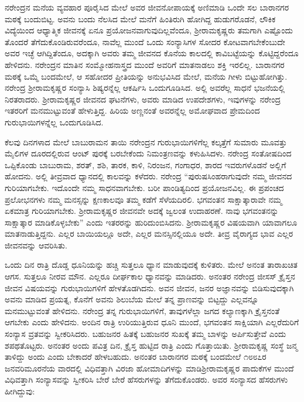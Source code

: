 ನರೇಂದ್ರನ ಮನೆಯ ವ್ಯವಹಾರ ಪೂರೈಸಿದ ಮೇಲೆ ಅವರ ಜೀವನೋಪಾಯಕ್ಕೆ ಅಣಿಮಾಡಿ ಒಂದೇ ಸಲ ಬಾರಾನಗರ ಮಠಕ್ಕೆ ಬಂದುಬಿಟ್ಟ. ಅವನು ಬಂದು ನೆಲಸಿದ ಮೇಲೆ ಮನೆಗೆ ಹಿಂತಿರುಗಿ ಹೋಗಿದ್ದ ಹುಡುಗರೊಡನೆ, ಲೌಕಿಕ ವಿದ್ಯೆಯಿಂದ ಆಧ್ಯಾತ್ಮಿಕ ಜೀವನಕ್ಕೆ ಏನೂ ಪ್ರಯೋಜನವಾಗುವುದಿಲ್ಲವೆಂದೂ, ಶ‍್ರೀರಾಮಕೃಷ್ಣರು ತಮಗಾಗಿ ಎಷ್ಟೊಂದು ತೊಂದರೆ ತೆಗೆದುಕೊಂಡಿರುವರೆಂದೂ, ನಾವೆಲ್ಲ ಮುಂದೆ ಒಂದು ಸಂನ್ಯಾಸಿಗಳ ಸೋದರ ಕೋಟವಾಗಬೇಕೆಂಬುದೇ ಅವರ ಇಚ್ಛೆ ಆಗಿದ್ದಿತೆಂದೂ, ಅದಕ್ಕಾಗಿ ಅವರು ತಮ್ಮ ಜೀವನದ ಕೊನೆಯ ಕಾಲದಲ್ಲಿ ಕಾವಿಬಟ್ಟೆಯನ್ನು ಕೊಟ್ಟಿದ್ದರೆಂದೂ ಹೇಳಿದನು. ನರೇಂದ್ರನ ಮಾತಿನ ಸಂಮ್ಮೋಹನಾಸ್ತ್ರದ ಮುಂದೆ ಅವರಿಗೆ ಮಾತನಾಡಲು ಶಕ್ತಿ ಇರಲಿಲ್ಲ. ಬಾರಾನಗರ ಮಠಕ್ಕೆ ಒಮ್ಮೆ ಬಂದಮೇಲೆ, ಆ ಸಹೋದರ ಪ್ರೀತಿಯನ್ನು ಅನುಭವಿಸಿದ ಮೇಲೆ, ಮನೆಯ ಗೀಳು ಬಿಟ್ಟುಹೋಗಿತ್ತು. ನರೇಂದ್ರ ಶ‍್ರೀರಾಮಕೃಷ್ಣರ ಸಂನ್ಯಾಸಿ ಶಿಷ್ಯರನ್ನೆಲ್ಲ ಆಕರ್ಷಿಸಿ ಒಂದುಗೂಡಿಸಿದ. ಅಲ್ಲಿ ಅವರೆಲ್ಲ ಸಾಧನೆ ಭಜನೆಯಲ್ಲಿ ನಿರತರಾದರು. ಶ‍್ರೀರಾಮಕೃಷ್ಣರ ಜೀವನದ ಘಟನೆಗಳು, ಅವರು ಮಾಡಿದ ಉಪದೇಶಗಳು, ಇವುಗಳನ್ನು ನರೇಂದ್ರ ಇತರರಿಗೆ ಮನಮುಟ್ಟುವಂತೆ ಹೇಳುತ್ತಿದ್ದ. ಹಿರಿಯ ಅಣ್ಣನಂತೆ ಅವರನ್ನೆಲ್ಲ ಅಮೋಘವಾದ ಪ್ರೇಮದಿಂದ ಗುರುಭಾಯಿಗಳನ್ನೆಲ್ಲ ಒಂದುಗೂಡಿಸಿದ.

ಕೆಲವು ದಿನಗಳಾದ ಮೇಲೆ ಬಾಬುರಾಮನ ತಾಯಿ ನರೇಂದ್ರನ ಗುರುಭಾಯಿಗಳಿಗೆಲ್ಲ ಕಲ್ಕತ್ತೆಗೆ ಸುಮಾರು ಮೂವತ್ತು ಮೈಲಿಗಳ ದೂರದಲ್ಲಿರುವ ಆಂಟ್ ಪುರಕ್ಕೆ ಬರಬೇಕೆಂದು ನಿಮಂತ್ರಣವನ್ನು ಕಳುಹಿಸಿದಳು. ನರೇಂದ್ರ ಸಂತೋಷದಿಂದ ಒಪ್ಪಿಕೊಂಡು ಬಾಬುರಾಮ, ಶರತ್, ಶಶಿ, ತಾರಕ, ಕಾಳಿ, ನಿರಂಜನ, ಗಂಗಾಧರ, ಶಾರದ ಇವರುಗಳೊಡನೆ ಅಲ್ಲಿಗೆ ಹೋದನು. ಅಲ್ಲಿ ತೀವ್ರವಾದ ಧ್ಯಾನದಲ್ಲಿ ಕಾಲವನ್ನು ಕಳೆದರು. ನರೇಂದ್ರ “ಪುರುಷಸಿಂಹರಾಗುವುದೇ ನಮ್ಮ ಜೀವನದ ಗುರಿಯಾಗಬೇಕು. ಇದೊಂದೇ ನಮ್ಮ ಸಾಧನವಾಗಬೇಕು. ಬರೀ ಪಾಂಡಿತ್ಯದಿಂದ ಪ್ರಯೋಜನವಿಲ್ಲ. ಈ ಪ್ರಪಂಚದ ಪ್ರಲೋಭನಗಳು ನಮ್ಮ ಮನಸ್ಸನ್ನು ಕ್ಷಣಕಾಲವೂ ತಮ್ಮ ಕಡೆಗೆ ಸೆಳೆಯದಿರಲಿ. ಭಗವಂತನ ಸಾಕ್ಷಾತ್ಕಾರಾವೇ ನಮ್ಮ ಏಕಮಾತ್ರ ಗುರಿಯಾಗಬೇಕು. ಶ‍್ರೀರಾಮಕೃಷ್ಣರ ಜೀವನವೇ ಅದಕ್ಕೆ ಜ್ವಲಂತ ಉದಾಹರಣೆ. ನಾವು ಭಗವಂತನನ್ನು ಸಾಕ್ಷಾತ್ಕಾರ ಮಾಡಿಕೊಳ್ಳಬೇಕು” ಎಂದು ಇತರರನ್ನು ಹುರಿದುಂಬಿಸಿದನು. ಶ‍್ರೀರಾಮಕೃಷ್ಣರ ವಿಷಯವಾಗಿ ಯಾವಾಗಲೂ ಮಾತನಾಡುತ್ತಿದ್ದನು. ಎಲ್ಲರ ಬಾಯಿಯಲ್ಲೂ ಅದೇ, ಎಲ್ಲರ ಮನಸ್ಸಿನಲ್ಲಿಯೂ ಅದೇ. ತೀವ್ರ ವೈರಾಗ್ಯದ ಭಾವ ಎಲ್ಲರ ಜೀವನವನ್ನು ಆವರಿಸಿತು.

ಒಂದು ದಿನ ರಾತ್ರಿ ದೊಡ್ಡ ಧೂನಿಯನ್ನು ಹಚ್ಚಿ ಸುತ್ತಲೂ ಧ್ಯಾನ ಮಾಡುವುದಕ್ಕೆ ಕುಳಿತರು. ಮೇಲೆ ಅನಂತ ತಾರಾಖಚಿತ ಆಗಸ. ಸುತ್ತಲೂ ನೀರವ ಮೌನ. ಎಲ್ಲರೂ ದೀರ್ಘಕಾಲ ಧ್ಯಾನವನ್ನು ಮಾಡಿದರು. ಅನಂತರ ನರೇಂದ್ರ ಜೀಸಸ್ ಕ್ರೈಸ್ತನ ಜೀವನ ವಿಷಯವನ್ನು ಗುರುಭಾಯಿಗಳಿಗೆ ಹೇಳತೊಡಗಿದನು. ಅವನ ಜೀವನ, ಜನರ ಅಜ್ಞಾನವನ್ನು ಬಿಡಿಸುವುದಕ್ಕಾಗಿ ಅವನು ಮಾಡಿದ ಪ್ರಯತ್ನ, ಕೊನೆಗೆ ಅವನು ಶಿಲುಬೆಯ ಮೇಲೆ ತನ್ನ ಪ್ರಾಣವನ್ನು ಬಿಟ್ಟದ್ದು ಎಲ್ಲವನ್ನೂ ಮನಮುಟ್ಟುವಂತೆ ಹೇಳಿದನು. ನರೇಂದ್ರ ತನ್ನ ಗುರುಭಾಯಿಗಳಿಗೆ, ತಾವುಗಳೆಲ್ಲಾ ಜಗದ ಕಲ್ಯಾಣಕ್ಕಾಗಿ ಕ್ರೈಸ್ತನಂತೆ ಆಗಬೇಕು ಎಂದು ಹೇಳಿದನು. ಅಂದಿನ ರಾತ್ರಿ ಉರಿಯುತ್ತಿರುವ ಧೂನಿ ಮುಂದೆ, ಭಗವಂತನ ಸಾಕ್ಷಿಯಾಗಿ ಎಲ್ಲರೆದುರಿಗೆ ಸಂನ್ಯಾಸ ವ್ರತವನ್ನು ಸ್ವೀಕರಿಸಿದರು. ಬಹುಜನರ ಹಿತಕ್ಕೆ ಬಹುಜನರ ಸುಖಕ್ಕೆ ತಮ್ಮ ಬಾಳನ್ನು ಅರ್ಪಿಸುತ್ತೇವೆ ಎಂದು ಶಪಥತೊಟ್ಟರು. ಅನಂತರ ಅಂದು ಪವಿತ್ರ ದಿನ, ಕ್ರೈಸ್ತ ಹುಟ್ಟಿದ ರಾತ್ರಿ ಎಂದು ಗೊತ್ತಾಯಿತು. ಶ‍್ರೀರಾಮಕೃಷ್ಣ ಸಂಸ್ಥೆ ಜನ್ಮ ತಾಳಿದ್ದು ಅಂದು ಎಂದು ಬೇಕಾದರೆ ಹೇಳಬಹುದು. ಅನಂತರ ಬಾರಾನಗರ ಮಠಕ್ಕೆ ಬಂದಮೇಲೆ ೧೮೮೭ರ ಜನವರಿ\break ಮೂರನೆಯ ವಾರದಲ್ಲಿ ವಿಧಿವತ್ತಾಗಿ ವಿರಜಾ ಹೋಮಾದಿಗಳನ್ನು ಮಾಡಿ\break ಶ‍್ರೀರಾಮಕೃಷ್ಣರ ಪಾದುಕೆಗಳ ಮುಂದೆ ವಿಧಿವತ್ತಾಗಿ ಸಂನ್ಯಾಸವನ್ನು ಸ್ವೀಕರಿಸಿ ಬೇರೆ ಬೇರೆ ಹೆಸರುಗಳನ್ನು ತೆಗೆದುಕೊಂಡರು. ಅವರ ಸಂನ್ಯಾಸದ ಹೆಸರುಗಳು ಹೀಗಿದ್ದುವು:

